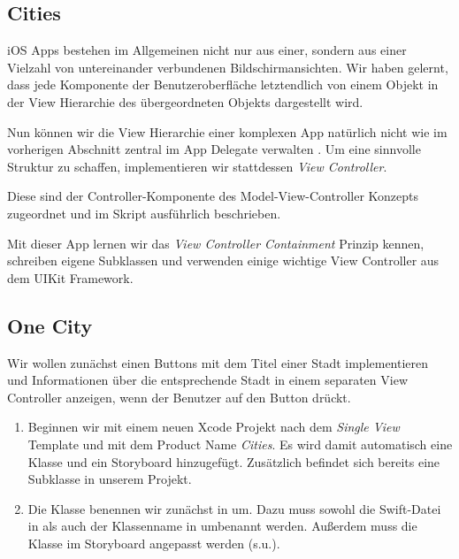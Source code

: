 \documentclass[parskip=half, final]{scrreprt}
\begin{document}
\begin{lecture}


\chapter{Cities}

\mvcindicatorcontroller

iOS Apps bestehen im Allgemeinen nicht nur aus einer, sondern aus einer Vielzahl von untereinander verbundenen Bildschirmansichten. Wir haben gelernt, dass jede Komponente der Benutzeroberfläche letztendlich von einem  Objekt in der View Hierarchie des übergeordneten  Objekts dargestellt wird.

Nun können wir die View Hierarchie einer komplexen App natürlich nicht wie im vorherigen Abschnitt zentral im App Delegate verwalten . Um eine sinnvolle Struktur zu schaffen, implementieren wir stattdessen \emph{View Controller}.

Diese sind der Controller-Komponente des Model-View-Controller Konzepts zugeordnet und im Skript ausführlich beschrieben.

Mit dieser App lernen wir das \emph{View Controller Containment} Prinzip kennen, schreiben eigene  Subklassen und verwenden einige wichtige View Controller aus dem UIKit Framework.


\section{One City}\label{sec:one_city}

Wir wollen zunächst einen Buttons mit dem Titel einer Stadt implementieren und Informationen über die entsprechende Stadt in einem separaten View Controller anzeigen, wenn der Benutzer auf den Button drückt.

\begin{enumerate}

\item Beginnen wir mit einem neuen Xcode Projekt nach dem \emph{Single View} Template und mit dem Product Name \emph{Cities}. Es wird damit automatisch eine Klasse  und ein Storyboard hinzugefügt. Zusätzlich befindet sich bereits eine Subklasse  in unserem Projekt.

\item Die Klasse  benennen wir zunächst in  um. Dazu muss sowohl die Swift-Datei in  als auch der Klassenname in  umbenannt werden. Außerdem muss die Klasse im Storyboard angepasst werden (s.u.).


\end{enumerate}
\end{lecture}
\end{document}
